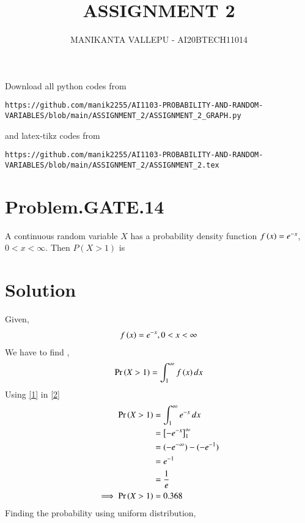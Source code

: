 \documentclass[journal,12pt,twocolumn]{IEEEtran}
\begin{document}
\vspace{3cm}
\title{ASSIGNMENT 2}
\author{MANIKANTA VALLEPU - AI20BTECH11014}
\maketitle
\newpage
\bigskip
\renewcommand{\thefigure}{\theenumi}
\renewcommand{\thetable}{\theenumi}
Download all python codes from 
\begin{lstlisting}
https://github.com/manik2255/AI1103-PROBABILITY-AND-RANDOM-VARIABLES/blob/main/ASSIGNMENT_2/ASSIGNMENT_2_GRAPH.py
\end{lstlisting}
%
and latex-tikz codes from 
%
\begin{lstlisting}
https://github.com/manik2255/AI1103-PROBABILITY-AND-RANDOM-VARIABLES/blob/main/ASSIGNMENT_2/ASSIGNMENT_2.tex
\end{lstlisting}
\section{Problem.GATE.14}
A continuous random variable $X$ has a probability density function 
$f\left(x\right) = e^{-x}$,$0<x<\infty$. Then $P(X > 1)$ is

\section{Solution}
Given,
\begin{align} \label{1}
f\left(x\right) = e^{-x} , 0<x<\infty
\end{align}
We have to find ,
\begin{align}
\Pr\left(X>1\right) = \int_{1}^{\infty}{f\left(x\right)}\,dx\label{2}
\end{align}
Using \eqref{1} in \eqref{2}
\begin{align}
\Pr\left(X>1\right) &= \int_{1}^{\infty}{e^{-x}}\,dx\\
&= \left[-e^{-x}\right]_1^{\infty}\\
&= (-e^{-\infty}) - (-e^{-1})\\
&= e^{-1}\\
&= \frac{1}{e}\\
 \implies \Pr\left(X>1\right) &= 0.368
\end{align}
Finding the probability using uniform distribution,
\end{document}
